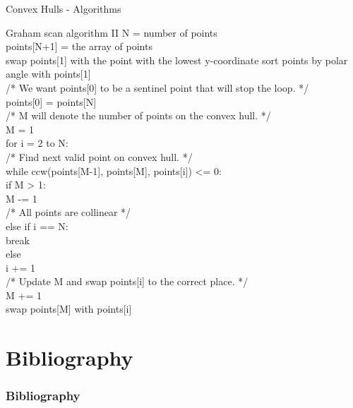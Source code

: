 \documentclass{beamer}
\begin{document}
\begin{frame}{Convex Hulls - Algorithms}
\begin{block}{Graham scan algorithm II}
\fontsize{6pt}{7.2}\selectfont
N  = number of points \\
points[N+1] = the array of points \\
swap points[1] with the point with the lowest y-coordinate sort points by polar angle with points[1] \\
/* We want points[0] to be a sentinel point that will stop the loop. */ \\
points[0] = points[N] \\
/* M will denote the number of points on the convex hull.  */ \\
M = 1 \\
for i = 2 to N: \\
    \hspace*{1cm}/* Find next valid point on convex hull. */ \\
    \hspace*{1cm}while ccw(points[M-1], points[M], points[i]) <= 0: \\
          \hspace*{1.5cm}if M > 1: \\
                  \hspace*{2cm}M -= 1 \\
          \hspace*{1.5cm}/* All points are collinear */ \\
          \hspace*{1.5cm}else if i == N: \\
                  \hspace*{2cm}break \\
          \hspace*{1.5cm}else \\
                  \hspace*{2cm}i += 1 \\
    \hspace*{1cm}/* Update M and swap points[i] to the correct place. */ \\
    \hspace*{1cm}M += 1 \\
    \hspace*{1cm}swap points[M] with points[i]
\end{block}
\end{frame}

\section{Bibliography}
\begin{frame}[allowframebreaks]
\frametitle{Bibliography}
    \tiny{ }
    
\end{frame}
\end{document}
